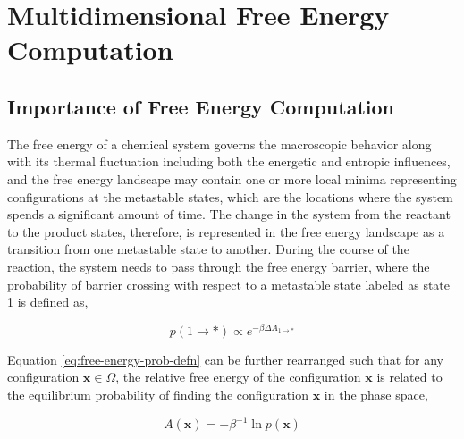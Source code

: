 \chapter{Multidimensional Free Energy Computation}

\section{Importance of Free Energy Computation}

\begin{spacing}{2.0}
    The free energy of a chemical system governs the macroscopic behavior along with its thermal fluctuation including both the energetic and 
    entropic influences, and the free energy landscape may contain one or more local minima representing configurations at the metastable states, 
    which are the locations where the system spends a significant amount of time. The change in the system from the reactant to the product states, 
    therefore, is represented in the free energy landscape as a transition from one metastable state to another. During the course of the reaction, 
    the system needs to pass through the free energy barrier, where the probability of barrier crossing with respect to a metastable state labeled as 
    state 1 is defined as,

    \begin{equation}
        p(1\to *) \propto e^{-\beta\Delta A_{1\to *}}
        \label{eq:free-energy-prob-defn}
    \end{equation}

    Equation \ref{eq:free-energy-prob-defn} can be further rearranged such that for any configuration $\mathbf{x} \in \Omega$,  the relative free 
    energy of the configuration $\mathbf{x}$ is related to the equilibrium probability of finding the configuration $\mathbf{x}$ in the phase space,

    \begin{equation}
        A(\mathbf{x}) = -\beta^{-1}\ln p(\mathbf{x})
    \end{equation}
\end{spacing}
